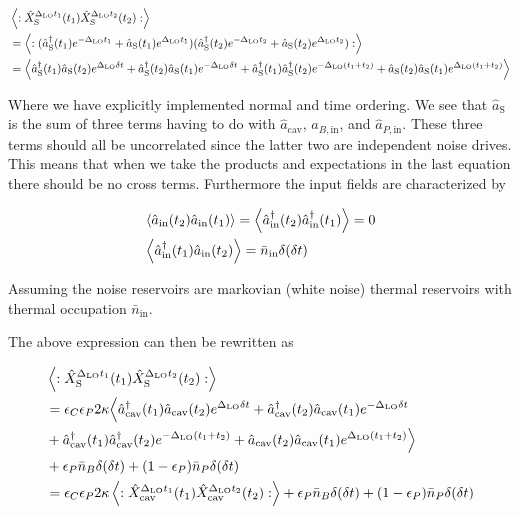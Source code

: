 \documentclass[12pt]{article}
\newcommand{\ep}{\epsilon}
\begin{document}
\begin{align}
&\Braket{:\hat{X}_{\text{S}}^{\Delta_{\text{LO}}t_1}(t_1)\hat{X}_{\text{S}}^{\Delta_{\text{LO}}t_2}(t_2) :}\\
&=\Braket{:(\hat{a}^{\dag}_{\text{S}}(t_1) e^{-\Delta_{\text{LO}}t_1} + \hat{a}_{\text{S}}(t_1) e^{\Delta_{\text{LO}}t_1})(\hat{a}^{\dag}_{\text{S}}(t_2) e^{-\Delta_{\text{LO}}t_2} + \hat{a}_{\text{S}}(t_2) e^{\Delta_{\text{LO}}t_2}) :}\\
&= \Braket{\hat{a}^{\dag}_{\text{S}}(t_1)\hat{a}_{\text{S}}(t_2)e^{\Delta_{\text{LO}}\delta t} + \hat{a}^{\dag}_{\text{S}}(t_2)\hat{a}_{\text{S}}(t_1)e^{-\Delta_{\text{LO}}\delta t} + \hat{a}^{\dag}_{\text{S}}(t_1)\hat{a}^{\dag}_{\text{S}}(t_2)e^{-\Delta_{\text{LO}}(t_1+t_2)} + \hat{a}_{\text{S}}(t_2)\hat{a}_{\text{S}}(t_1)e^{\Delta_{\text{LO}}(t_1+t_2)}  }
\end{align}

Where we have explicitly implemented normal and time ordering.
We see that $\hat{a}_{\text{S}}$ is the sum of three terms having to do with $\hat{a}_{\text{cav}}$, $\hat{a}_{B,\text{in}}$, and $\hat{a}_{P,\text{in}}$. These three terms should all be uncorrelated since the latter two are independent noise drives. This means that when we take the products and expectations in the last equation there should be no cross terms. Furthermore the input fields are characterized by

\begin{align}
&\Braket{\hat{a}_{\text{in}}(t_2)\hat{a}_{\text{in}}(t_1)} = \Braket{\hat{a}^{\dag}_{\text{in}}(t_2)\hat{a}^{\dag}_{\text{in}}(t_1)} = 0\\ 
& \Braket{\hat{a}^{\dag}_{\text{in}}(t_1)\hat{a}_{\text{in}}(t_2)} = \bar{n}_{\text{in}} \delta(\delta t)
\end{align}

Assuming the noise reservoirs are markovian (white noise) thermal reservoirs with thermal occupation $\bar{n}_{\text{in}}$.

The above expression can then be rewritten as

\begin{align}
&\Braket{:\hat{X}_{\text{S}}^{\Delta_{\text{LO}}t_1}(t_1)\hat{X}_{\text{S}}^{\Delta_{\text{LO}}t_2}(t_2) :}\\
&=\ep_C \ep_P 2\kappa \Big \langle \hat{a}^{\dag}_{\text{cav}}(t_1)\hat{a}_{\text{cav}}(t_2)e^{\Delta_{\text{LO}}\delta t} + \hat{a}^{\dag}_{\text{cav}}(t_2)\hat{a}_{\text{cav}}(t_1)e^{-\Delta_{\text{LO}}\delta t}\\
&+ \hat{a}^{\dag}_{\text{cav}}(t_1)\hat{a}^{\dag}_{\text{cav}}(t_2)e^{-\Delta_{\text{LO}}(t_1+t_2)} + \hat{a}_{\text{cav}}(t_2)\hat{a}_{\text{cav}}(t_1)e^{\Delta_{\text{LO}}(t_1+t_2)} \Big \rangle\\
&+\ep_P \bar{n}_B\delta(\delta t) + (1-\ep_P) \bar{n}_P \delta(\delta t)\\
&= \ep_C \ep_P 2 \kappa \Braket{:\hat{X}_{\text{cav}}^{\Delta_{\text{LO}}t_1}(t_1)\hat{X}_{\text{cav}}^{\Delta_{\text{LO}}t_2}(t_2) :} +\ep_P \bar{n}_B \delta(\delta t) + (1-\ep_P) \bar{n}_P \delta(\delta t)
\end{align}
\end{document}
